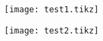 \documentclass[12pt, a4paper]{article}
\begin{document}
    \centering
    \begin{figure}
        \null\hfill
        \begin{subfigure}{0.45\textwidth}
            \texttt{[image: test1.tikz]}
        \end{subfigure}
        \hfill
        \begin{subfigure}{0.45\textwidth}
            \texttt{[image: test2.tikz]}
        \end{subfigure}
        \hfill\null
    \end{figure} 
\end{document}
